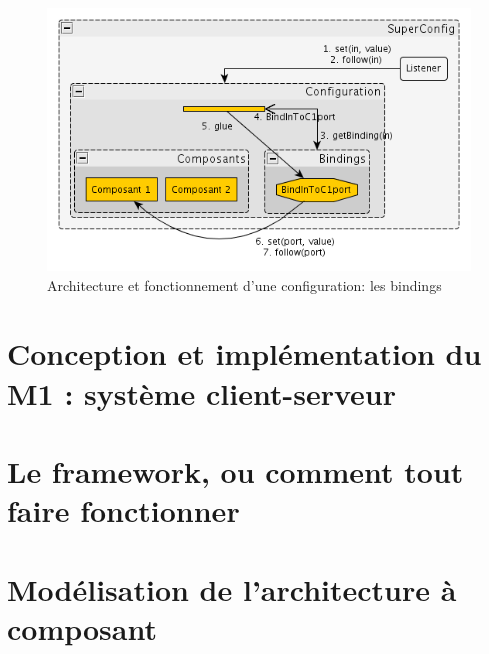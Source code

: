 \documentclass[a4paper, titlepage]{article}
\begin{document}
			\begin{figure}[ht]
				\centering
				\includegraphics[width=1.00\textwidth]{obsimpl2.png}
				\caption{Architecture et fonctionnement d'une configuration: les bindings}
				\label{fig:obsimpl2}
			\end{figure}
			
			
	\section{Conception et implémentation du M1 : système client-serveur}
	
	
	\section{Le framework, ou comment tout faire fonctionner}
	
	
	\section{Modélisation de l'architecture à composant}
	
	
	
	
\end{document}
